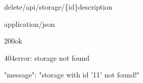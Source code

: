 \documentclass[12pt,a4paper]{article}
\begin{document}
\begin{apiRoute}{delete}{/api/storage/\{id\}}{description}
	\begin{routeParameter}
	\end{routeParameter}
	\begin{routeResponse}{application/json}
		\begin{routeResponseItem}{200}{ok}
			
		\end{routeResponseItem}
		\begin{routeResponseItem}{404}{error: storage not found}
			\begin{routeResponseItemBody}
{
	"message": "storage with id '11' not found!"
}
			\end{routeResponseItemBody}
		\end{routeResponseItem}
	\end{routeResponse}
\end{apiRoute}
\end{document}
